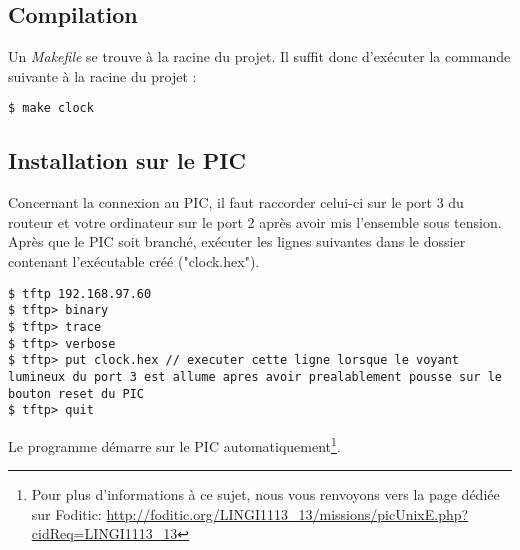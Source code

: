 
\subsection*{Compilation}

Un \textit{Makefile} se trouve à la racine du projet. Il suffit donc d'exécuter la commande suivante à la racine du projet :

\begin{lstlisting}
$ make clock
\end{lstlisting}

\subsection*{Installation sur le PIC}

Concernant la connexion au PIC, il faut raccorder celui-ci sur le port 3 du routeur et votre ordinateur sur le port 2 après avoir mis l'ensemble sous tension.
Après que le PIC soit branché, exécuter les lignes suivantes dans le dossier contenant l'exécutable créé ("clock.hex").
\begin{lstlisting}
$ tftp 192.168.97.60
$ tftp> binary
$ tftp> trace
$ tftp> verbose
$ tftp> put clock.hex // executer cette ligne lorsque le voyant lumineux du port 3 est allume apres avoir prealablement pousse sur le bouton reset du PIC
$ tftp> quit
\end{lstlisting}

Le programme démarre sur le PIC automatiquement\footnote{Pour plus d'informations à ce sujet, nous vous renvoyons vers la page dédiée sur Foditic: \url{http://foditic.org/LINGI1113_13/missions/picUnixE.php?cidReq=LINGI1113_13}}.

